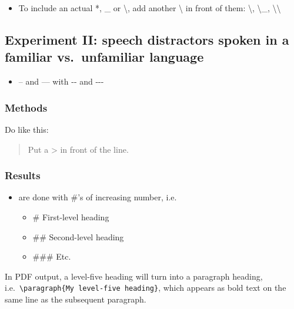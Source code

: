 \documentclass[a4paper, twoside]{templates/ociamthesis}
\providecommand{\tightlist}{%
  \setlength{\itemsep}{0pt}\setlength{\parskip}{0pt}}
\begin{document}
\begin{itemize}
\tightlist
\item
  To include an actual *, \_ or \textbackslash, add another \textbackslash{} in front of them: \textbackslash*, \textbackslash\_, \textbackslash\textbackslash{}
\end{itemize}

\hypertarget{experiment-ii-speech-distractors-spoken-in-a-familiar-vs.-unfamiliar-language}{%
\subsection{Experiment II: speech distractors spoken in a familiar vs.~unfamiliar language}\label{experiment-ii-speech-distractors-spoken-in-a-familiar-vs.-unfamiliar-language}}

\begin{itemize}
\tightlist
\item
  -- and --- with -\/- and -\/-\/-
\end{itemize}

\hypertarget{methods-1}{%
\subsubsection{Methods}\label{methods-1}}

Do like this:

\begin{quote}
Put a \textgreater{} in front of the line.
\end{quote}

\hypertarget{results-1}{%
\subsubsection{Results}\label{results-1}}

\begin{itemize}
\tightlist
\item
  are done with \#'s of increasing number, i.e.~

  \begin{itemize}
  \tightlist
  \item
    \# First-level heading
  \item
    \#\# Second-level heading
  \item
    \#\#\# Etc.
  \end{itemize}
\end{itemize}

In PDF output, a level-five heading will turn into a paragraph heading, i.e.~\texttt{\textbackslash{}paragraph\{My\ level-five\ heading\}}, which appears as bold text on the same line as the subsequent paragraph.
\end{document}

